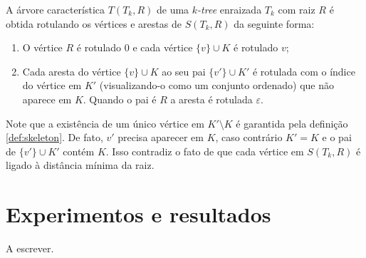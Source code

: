 \begin{definition}
  \cite{caminiti} A árvore característica $T(T_k, R)$ de uma \emph{$k$-tree} enraizada $T_k$ com raiz $R$ é obtida rotulando os vértices e arestas de $S(T_k, R)$ da seguinte forma:

  \begin{enumerate}
    \item O vértice $R$ é rotulado $0$ e cada vértice $\{v\} \cup K$ é rotulado $v$;
    \item Cada aresta do vértice $\{v\} \cup K$ ao seu pai $\{v'\} \cup K'$ é rotulada com o índice do vértice em $K'$ (visualizando-o como um conjunto ordenado) que não aparece em $K$. Quando o pai é $R$ a aresta é rotulada $\varepsilon$.
  \end{enumerate}

  Note que a existência de um único vértice em $K' \setminus K$ é garantida pela definição \ref{def:skeleton}. De fato, $v'$ precisa aparecer em $K$, caso contrário $K' = K$ e o pai de $\{v'\} \cup K'$ contém $K$. Isso contradiz o fato de que cada vértice em $S(T_k, R)$ é ligado à distância mínima da raiz.
\end{definition}

\section{Experimentos e resultados}

A escrever. %

